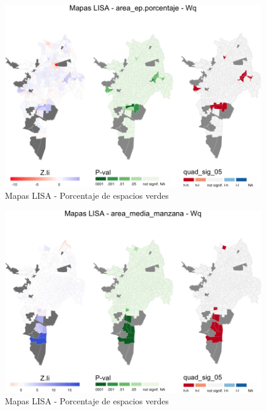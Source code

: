 \documentclass[12pt,]{book}
\begin{document}
\begin{figure}
\includegraphics[width=1\linewidth]{tesis-unigis_files/figure-latex/lisa-areaep-amm-1} \caption{Mapas LISA - Porcentaje de espacios verdes}\label{fig:lisa-areaep-amm1}
\end{figure}\begin{figure}
\includegraphics[width=1\linewidth]{tesis-unigis_files/figure-latex/lisa-areaep-amm-2} \caption{Mapas LISA - Porcentaje de espacios verdes}\label{fig:lisa-areaep-amm2}
\end{figure}
\end{document}
